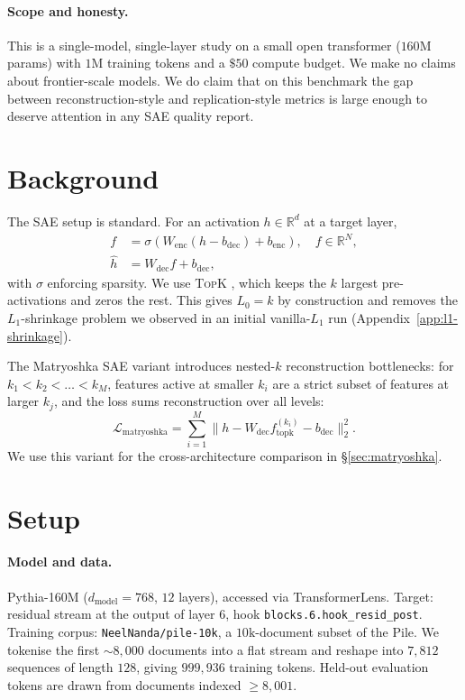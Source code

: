 \documentclass[11pt]{article}
\begin{document}
\paragraph{Scope and honesty.}
This is a single-model, single-layer study on a small open transformer
($160$M params) with $1\text{M}$ training tokens and a $\$50$ compute
budget. We make no claims about frontier-scale models. We do claim that
on this benchmark the gap between reconstruction-style and
replication-style metrics is large enough to deserve attention in any
SAE quality report.

\section{Background}

The SAE setup is standard. For an activation $h \in \mathbb{R}^d$ at a
target layer,
\begin{align}
f &= \sigma(W_{\text{enc}} (h - b_{\text{dec}}) + b_{\text{enc}}), \quad
f \in \mathbb{R}^N, \\
\hat{h} &= W_{\text{dec}} f + b_{\text{dec}},
\end{align}
with $\sigma$ enforcing sparsity. We use \textsc{TopK}
\cite{gao2024topk}, which keeps the $k$ largest pre-activations and zeros
the rest. This gives $L_0 = k$ by construction and removes the
$L_1$-shrinkage problem \cite{rajamanoharan2024gated} we observed in an
initial vanilla-$L_1$ run (Appendix~\ref{app:l1-shrinkage}).

The Matryoshka SAE variant \cite{bussmann2025matryoshka} introduces
nested-$k$ reconstruction bottlenecks: for $k_1 < k_2 < \dots < k_M$,
features active at smaller $k_i$ are a strict subset of features at larger
$k_j$, and the loss sums reconstruction over all levels:
\begin{equation}
\mathcal{L}_{\text{matryoshka}} = \sum_{i=1}^{M} \| h - W_{\text{dec}} f^{(k_i)}_{\text{topk}} - b_{\text{dec}} \|_2^2.
\end{equation}
We use this variant for the cross-architecture comparison in
\S\ref{sec:matryoshka}.

\section{Setup}

\paragraph{Model and data.}
Pythia-160M \cite{biderman2023pythia} ($d_{\text{model}}=768$, $12$
layers), accessed via TransformerLens. Target: residual stream at the
output of layer $6$, hook \texttt{blocks.6.hook\_resid\_post}.
Training corpus: \texttt{NeelNanda/pile-10k}, a $10\text{k}$-document
subset of the Pile. We tokenise the first $\sim 8{,}000$ documents into a
flat stream and reshape into $7{,}812$ sequences of length $128$, giving
$999{,}936$ training tokens. Held-out evaluation tokens are drawn from
documents indexed $\geq 8{,}001$.
\end{document}
